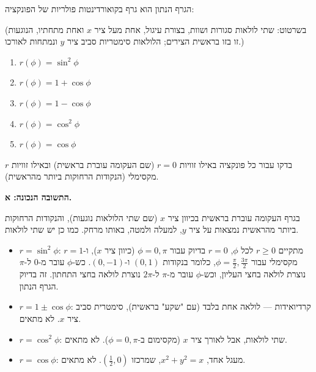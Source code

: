 
\begin{question}
הגרף הנתון הוא גרף בקואורדינטות פולריות של הפונקציה:

(בשרטוט: שתי לולאות סגורות ושוות, בצורת עיגול, אחת מעל ציר $x$ ואחת מתחתיו, הנוגעות זו בזו בראשית הצירים; הלולאות סימטריות סביב ציר $y$ ונמתחות לאורכו.)
\begin{enumerate}
  \item $r(\phi)=\sin^2\phi$
  \item $r(\phi)=1+\cos\phi$
  \item $r(\phi)=1-\cos\phi$
  \item $r(\phi)=\cos^2\phi$
  \item $r(\phi)=\cos\phi$
\end{enumerate}
\end{question}

\begin{hint}
בדקו עבור כל פונקציה באילו זוויות $r=0$ (שם העקומה עוברת בראשית) ובאילו זוויות $r$ מקסימלי (הנקודות הרחוקות ביותר מהראשית).
\end{hint}

\begin{solution}
\textbf{התשובה הנכונה: א.}

בגרף העקומה עוברת בראשית בכיוון ציר $x$ (שם שתי הלולאות נוגעות), והנקודות הרחוקות ביותר מהראשית נמצאות על ציר $y$, למעלה ולמטה, באותו מרחק. כמו כן יש שתי לולאות.

\begin{itemize}
  \item $r=\sin^2\phi$: מתקיים $r\ge0$ לכל $\phi$, $r=0$ בדיוק עבור $\phi=0,\pi$ (כיוון ציר $x$), ו-$r=1$ מקסימלי עבור $\phi=\frac{\pi}{2},\frac{3\pi}{2}$, כלומר בנקודות $(0,1)$ ו-$(0,-1)$. כש-$\phi$ עובר מ-$0$ ל-$\pi$ נוצרת לולאה בחצי העליון, וכש-$\phi$ עובר מ-$\pi$ ל-$2\pi$ נוצרת לולאה בחצי התחתון. זה בדיוק הגרף הנתון.
  \item $r=1\pm\cos\phi$: קרדיואידות --- לולאה אחת בלבד (עם "שקע" בראשית), סימטרית סביב ציר $x$. לא מתאים.
  \item $r=\cos^2\phi$: שתי לולאות, אבל לאורך ציר $x$ (מקסימום ב-$\phi=0,\pi$). לא מתאים.
  \item $r=\cos\phi$: מעגל אחד, $x^2+y^2=x$, שמרכזו $(\frac12,0)$. לא מתאים.
\end{itemize}
\end{solution}
